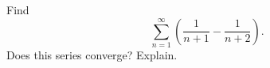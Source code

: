 Find
\[
\sum_{n=1}^{\infty}\left(\dfrac{1}{n+1}-\dfrac{1}{n+2}\right).
\]
Does this series converge? Explain.
